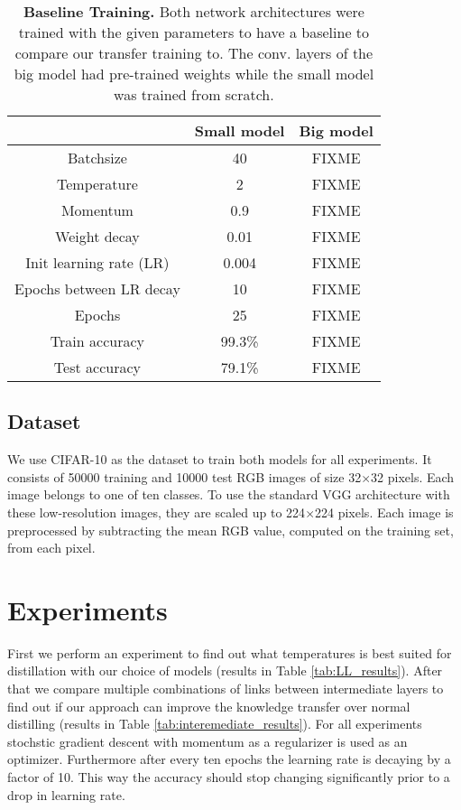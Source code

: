 \documentclass[10pt,twocolumn,letterpaper]{article}
\begin{document}
\begin{table}[]
	\begin{center}
	\begin{tabular}{|c|c|c|}
		\hline
									&	Small model & Big model \\ \hline
		Batchsize					&	40			&	FIXME	\\ \hline
		Temperature					&	2			&	FIXME	\\ \hline
		Momentum					&	0.9			&	FIXME	\\ \hline
		Weight decay				&	0.01		&	FIXME	\\ \hline
		Init learning rate (LR)		&	0.004		&	FIXME	\\ \hline
		Epochs between LR decay 	&	10			&	FIXME	\\ \hline
		Epochs						&	25			&	FIXME	\\ \hline
		Train accuracy				&	99.3\%		&	FIXME	\\ \hline
		Test accuracy				&	79.1\%		&	FIXME	\\ \hline
	\end{tabular}
	\end{center}
	\caption{\textbf{Baseline Training.} Both network architectures were trained with the given parameters to have a baseline to compare our transfer training to. The conv. layers of the big model had pre-trained weights while the small model was trained from scratch.}
	\label{tab:baseline_small_big}
\end{table}


\subsection{Dataset}
We use CIFAR-10 \cite{krizhevsky2009learning} as the dataset to train both models for all experiments. It consists of 50000 training and 10000 test RGB images of size 32$\times$32 pixels. Each image belongs to one of ten classes. To use the standard VGG architecture with these low-resolution images, they are scaled up to 224$\times$224 pixels. Each image is preprocessed by subtracting the mean RGB value, computed on the training set, from each pixel. 
 

\section{Experiments}
First we perform an experiment to find out what temperatures is best suited for distillation with our choice of models (results in Table \ref{tab:LL_results}). After that we compare multiple combinations of links between intermediate layers to find out if our approach can improve the knowledge transfer over normal distilling (results in Table \ref{tab:interemediate_results}). For all experiments stochstic gradient descent with momentum as a regularizer is used as an optimizer. Furthermore after every ten epochs the learning rate is decaying by a factor of 10. This way the accuracy should stop changing significantly prior to a drop in learning rate.
\end{document}
